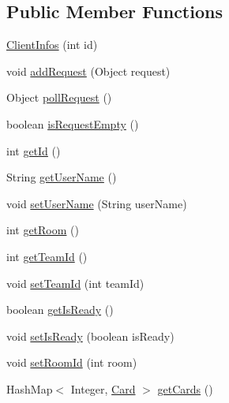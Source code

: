 \subsection*{Public Member Functions}
\begin{DoxyCompactItemize}
\item 
\mbox{\hyperlink{classServer_1_1ServerConnexion_1_1ClientInfos_a970d91293292cf6f463e532dc69734cf}{Client\+Infos}} (int id)
\item 
void \mbox{\hyperlink{classServer_1_1ServerConnexion_1_1ClientInfos_a50227a4e9e1c8210b77183e90119ae8e}{add\+Request}} (Object request)
\item 
Object \mbox{\hyperlink{classServer_1_1ServerConnexion_1_1ClientInfos_a6b62e65651d69cea2fde466c77bcf8b2}{poll\+Request}} ()
\item 
boolean \mbox{\hyperlink{classServer_1_1ServerConnexion_1_1ClientInfos_a524923ad3071663acb7dfba9d42e20a2}{is\+Request\+Empty}} ()
\item 
int \mbox{\hyperlink{classServer_1_1ServerConnexion_1_1ClientInfos_a10ffde5dcae701e2d279ed93854433c4}{get\+Id}} ()
\item 
String \mbox{\hyperlink{classServer_1_1ServerConnexion_1_1ClientInfos_a6614d5ebe7b522247006a2c89e7e3333}{get\+User\+Name}} ()
\item 
void \mbox{\hyperlink{classServer_1_1ServerConnexion_1_1ClientInfos_a7b48005e4d20338b8e0c952827111bf0}{set\+User\+Name}} (String user\+Name)
\item 
int \mbox{\hyperlink{classServer_1_1ServerConnexion_1_1ClientInfos_ad545432f341ce38c57e341617366361f}{get\+Room}} ()
\item 
int \mbox{\hyperlink{classServer_1_1ServerConnexion_1_1ClientInfos_a18960a701432d548bc20fc1955dbd154}{get\+Team\+Id}} ()
\item 
void \mbox{\hyperlink{classServer_1_1ServerConnexion_1_1ClientInfos_a6732e1179ce660c6c874053d82136498}{set\+Team\+Id}} (int team\+Id)
\item 
boolean \mbox{\hyperlink{classServer_1_1ServerConnexion_1_1ClientInfos_a871e9ffff7d78ef66257cb69974af05c}{get\+Is\+Ready}} ()
\item 
void \mbox{\hyperlink{classServer_1_1ServerConnexion_1_1ClientInfos_a4f001fc33e2fef60c5fbbb7f7ffce9c3}{set\+Is\+Ready}} (boolean is\+Ready)
\item 
void \mbox{\hyperlink{classServer_1_1ServerConnexion_1_1ClientInfos_a98c355362aabfa1b4fdc1a5ab108c6d0}{set\+Room\+Id}} (int room)
\item 
Hash\+Map$<$ Integer, \mbox{\hyperlink{classCommon_1_1Card}{Card}} $>$ \mbox{\hyperlink{classServer_1_1ServerConnexion_1_1ClientInfos_a3ae6c7e00203eb9468ba54f32707baf5}{get\+Cards}} ()

\end{DoxyCompactItemize}
